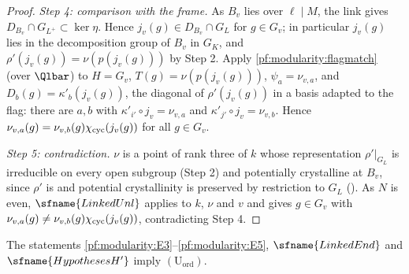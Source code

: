 \begin{proof}
\emph{Step 4: comparison with the frame.} As $B_v$ lies over $\ell\mid M$, the link gives
$D_{B_v}\cap G_{L^+}\subset\ker\eta$. Hence $j_v(g)\in D_{B_v}\cap G_L$ for $g\in G_v$; in particular $j_v(g)$ lies in the
decomposition group of $B_v$ in $G_K$, and $\rho'(j_v(g))=\nu(p(j_v(g)))$ by Step 2. Apply \cref{pf:modularity:flagmatch}
(over $\Qlbar$) to $H=G_v$, $T(g)=\nu(p(j_v(g)))$, $\psi_a=\nu_{v,a}$, and $D_b(g)=\kappa'_b(j_v(g))$, the diagonal of
$\rho'(j_v(g))$ in a basis adapted to the flag: there are $a,b$ with $\kappa'_{i'}\circ j_v=\nu_{v,a}$ and
$\kappa'_{j'}\circ j_v=\nu_{v,b}$. Hence $\nu_{v,a}(g)=\nu_{v,b}(g)\chi_{\mathrm{cyc}}(j_v(g))$ for all $g\in G_v$.

\emph{Step 5: contradiction.} $\nu$ is a point of rank three of $k$ whose representation $\rho'|_{G_L}$ is irreducible on
every open subgroup (Step 2) and potentially crystalline at $B_v$, since $\rho'$ is and potential crystallinity is
preserved by restriction to $G_L$ (). As $N$ is even, $\sfname{LinkedUnl}$ applies to
$k$, $\nu$ and $v$ and gives $g\in G_v$ with $\nu_{v,a}(g)\ne\nu_{v,b}(g)\chi_{\mathrm{cyc}}(j_v(g))$, contradicting Step 4.
\end{proof}

\begin{proposition}\label{pf:modularity:gdend}
The statements \ref{pf:modularity:E3}--\ref{pf:modularity:E5}, $\sfname{LinkedEnd}$ and $\sfname{HypothesesH'}$ imply
$(\mathrm{U}_{\mathrm{ord}})$.
\end{proposition}

